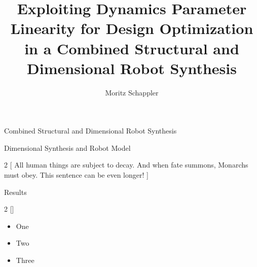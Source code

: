 \documentclass[c]{beamer}
\author[moritz.schappler@imes.uni-hannover.de]{Moritz Schappler}
\title{Exploiting Dynamics Parameter Linearity for Design Optimization in a Combined Structural and Dimensional Robot Synthesis}
\institute{Institute of Mechatronic Systems}
\newcommand{\postersubsection}[1]{%
\setlength\fboxsep{0pt}%
\vfil\penalty125\vfilneg\vskip1.5ex
\colorbox{Grau}{\parbox[b]{\columnwidth}{\vskip0.75ex%
\Large\hskip1ex #1%
\vskip0.75ex}}%
}
\begin{document}
\begin{frame}
\begin{block}{Combined Structural and Dimensional Robot Synthesis}
\parbox{\linewidth}{
}
\end{block}
\begin{whiteblock}{Dimensional Synthesis and Robot Model}
\parbox{\linewidth}{
\begin{multicols}{2}
[
All human things are subject to decay. And when fate summons, Monarchs must obey. This sentence can be even longer!
]
\blindtext[1]
\begin{figure}[t]
    \centering
    
\end{figure}

\end{multicols}}
\end{whiteblock}
\begin{block}{Results}
\parbox{\columnwidth}{
\begin{multicols}{2}
[]
\begin{itemize}
    \item One
    \item Two
    \item Three
\end{itemize}


\end{multicols}}
\end{block}
\end{frame}
\end{document}
